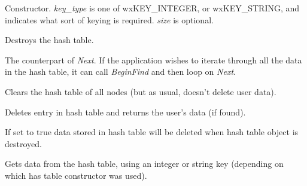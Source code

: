 \label{wxhashtablector}


Constructor. {\it key\_type} is one of wxKEY\_INTEGER, or wxKEY\_STRING,
and indicates what sort of keying is required. {\it size} is optional.

\label{wxhashtabledtor}


Destroys the hash table.

\label{wxhashtablebeginfind}


The counterpart of {\it Next}.  If the application wishes to iterate
through all the data in the hash table, it can call {\it BeginFind} and
then loop on {\it Next}.

\label{wxhashtableclear}


Clears the hash table of all nodes (but as usual, doesn't delete user data).

\label{wxhashtabledelete}



Deletes entry in hash table and returns the user's data (if found).

\label{wxhashtabledeletecontents}


If set to true data stored in hash table will be deleted when hash table object
is destroyed.


\label{wxhashtableget}



Gets data from the hash table, using an integer or string key (depending on which
has table constructor was used).

\label{wxhashtablemakekey}

